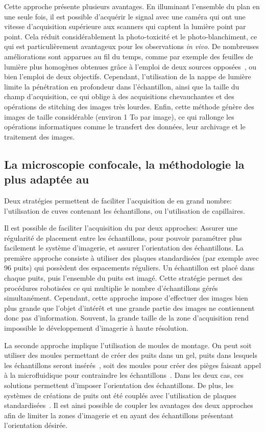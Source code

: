 \documentclass[\main/main.tex]{subfiles}
\begin{document}
Cette approche présente plusieurs avantages. En illuminant l'ensemble du plan en une seule fois, il est possible d'acquérir le signal avec une caméra qui ont une vitesse d'acquisition supérieure aux scanners qui captent la lumière point par point.
Cela réduit considérablement la photo\hyp{}toxicité et le photo\hyp{}blanchiment, ce qui est particulièrement avantageux pour les observations \textit{in vivo}.
%
De nombreuses améliorations sont apparues au fil du temps, comme par exemple des feuilles de lumière plus homogènes obtenues grâce à l'emploi de deux sources opposées~\cite{huisken_2007}, ou bien l'emploi de deux objectifs.
%
Cependant, l'utilisation de la nappe de lumière limite la pénétration en profondeur dans l'échantillon, ainsi que la taille du champ d'acquisition, ce qui oblige à des acquisitions chevauchantes et des opérations de stitching des images très lourdes. Enfin, cette méthode génère des images de taille considérable (environ 1 To par image), ce qui rallonge les opérations informatiques comme le transfert des données, leur archivage et le traitement des images.

    \subsection{La microscopie confocale, la méthodologie la plus adaptée au \hcs{}}
    \label{sec:acquisition_facilite}
Deux stratégies  permettent de faciliter l'acquisition de \pz{} en grand nombre: l'utilisation de cuves contenant les échantillons, ou l'utilisation de capillaires.
   
%
Il est possible de faciliter l'acquisition du \pz{} par deux approches:
Assurer une régularité de placement entre les échantillons,
pour pouvoir paramétrer plus facilement le système d'imagerie, et assurer l'orientation des échantillons.
%
La première approche consiste à utiliser des plaques standardisées (par exemple avec 96 puits) qui possèdent des espacements réguliers. Un échantillon est placé dans chaque puits, puis l'ensemble du puits est imagé. Cette stratégie permet des procédures robotisées ce qui multiplie le nombre d'échantillons gérés simultanément.
%
Cependant, cette approche impose d'effectuer des images bien plus grande que l'objet d'intérêt et une grande partie des images ne contiennent donc pas d'information. Souvent, la grande taille de la zone d'acquisition rend impossible le développement d'imagerie à haute résolution.

%
\label{sec:moule_montage}
La seconde approche implique l'utilisation de moules de montage.
%
On peut soit utiliser des moules permettant de créer des puits dans un gel, puits dans lesquels les échantillons seront insérés~\cite{donoughe_2018,kleinhans_2019}, soit des moules pour créer des pièges faisant appel à la microfluidique pour contraindre les échantillons~\cite{khalili_2019}. Dans les deux cas, ces solutions permettent d'imposer l'orientation des échantillons.
%
De plus, les systèmes de créations de puits ont été couplés avec l'utilisation de plaques standardisées~\cite{wittbrodt_2014}.
%
Il est ainsi possible de coupler les avantages des deux approches afin de limiter la zones d'imagerie et en ayant des échantillons présentant l'orientation désirée.
\end{document}
